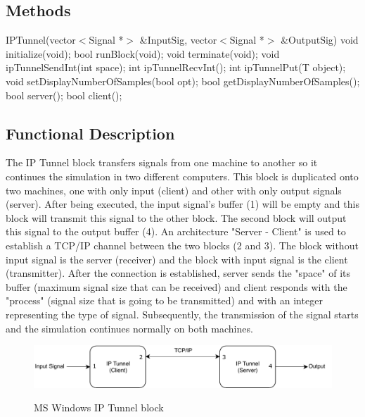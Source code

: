 %

\subsection*{Methods}
%
IPTunnel(vector$<$Signal *$>$ \&InputSig, vector$<$Signal *$>$ \&OutputSig)
\bigbreak
void initialize(void);
\bigbreak
bool runBlock(void);
\bigbreak
void terminate(void);
\bigbreak
void ipTunnelSendInt(int space);
\bigbreak
int ipTunnelRecvInt();
\bigbreak
int ipTunnelPut(T object);
\bigbreak
void setDisplayNumberOfSamples(bool opt);
\bigbreak
bool getDisplayNumberOfSamples();
\bigbreak
bool server();
\bigbreak
bool client();



\subsection*{Functional Description}

The IP Tunnel block transfers signals from one machine to another so it continues the simulation in two different computers. This block is duplicated onto two machines, one with only input (client) and other with only output signals (server). After being executed, the input signal's buffer (1) will be empty and this block will transmit this signal to the other block. The second block will output this signal to the output buffer (4). An architecture "Server - Client" is used to establish a TCP/IP channel between the two blocks (2 and 3). The block without input signal is the server (receiver) and the block with input signal is the client (transmitter). After the connection is established, server sends the "space" of its buffer (maximum signal size that can be received) and client responds with the "process" (signal size that is going to be transmitted) and with an integer representing the type of signal. Subsequently, the transmission of the signal starts and the simulation continues normally on both machines.

\begin{figure}[h]
	\centering
	\includegraphics[width=1.0\textwidth]{./lib/ms_windows_ip_tunnel/figures/StructureTCPIP2.pdf}
	\label{IP Tunnel Block}\caption{MS Windows IP Tunnel block}
\end{figure}